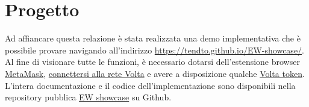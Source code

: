 \chapter*{Progetto}
Ad affiancare questa relazione è stata realizzata una demo implementativa che è possibile provare navigando all'indirizzo \url{https://tendto.github.io/EW-showcase/}.
Al fine di visionare tutte le funzioni, è necessario dotarsi dell'estensione browser \href{https://metamask.io/}{MetaMask}, \href{https://energyweb.atlassian.net/wiki/spaces/EWF/pages/703201459/Volta+Connecting+to+Remote+RPC+and+Metamask}{connettersi alla rete Volta} e avere a disposizione qualche \href{https://voltafaucet.energyweb.org/}{Volta token}. \\

L'intera documentazione e il codice dell'implementazione sono disponibili nella repository pubblica \href{https://github.com/TendTo/EW-showcase}{EW showcase} su Github.\\